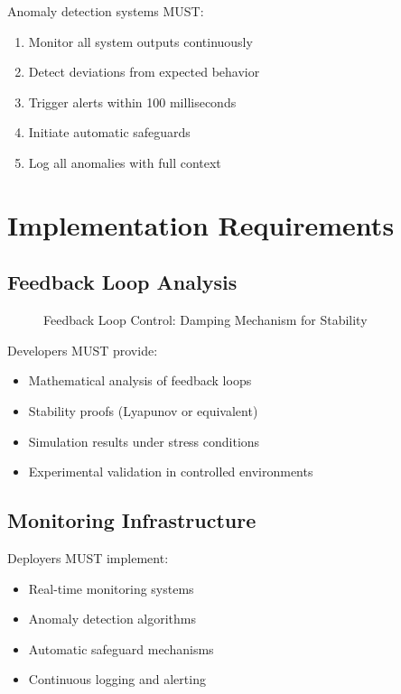 \begin{articlebox}
Anomaly detection systems MUST:
\begin{enumerate}
    \item Monitor all system outputs continuously
    \item Detect deviations from expected behavior
    \item Trigger alerts within 100 milliseconds
    \item Initiate automatic safeguards
    \item Log all anomalies with full context
\end{enumerate}
\end{articlebox}

\vspace{0.5cm}

\section{Implementation Requirements}

\subsection{Feedback Loop Analysis}

\begin{figure}[h]
\centering

\caption{Feedback Loop Control: Damping Mechanism for Stability}
\label{fig:feedback-loop}
\end{figure}

Developers MUST provide:

\begin{itemize}
    \item Mathematical analysis of feedback loops
    \item Stability proofs (Lyapunov or equivalent)
    \item Simulation results under stress conditions
    \item Experimental validation in controlled environments
\end{itemize}

\subsection{Monitoring Infrastructure}

Deployers MUST implement:

\begin{itemize}
    \item Real-time monitoring systems
    \item Anomaly detection algorithms
    \item Automatic safeguard mechanisms
    \item Continuous logging and alerting
\end{itemize}

